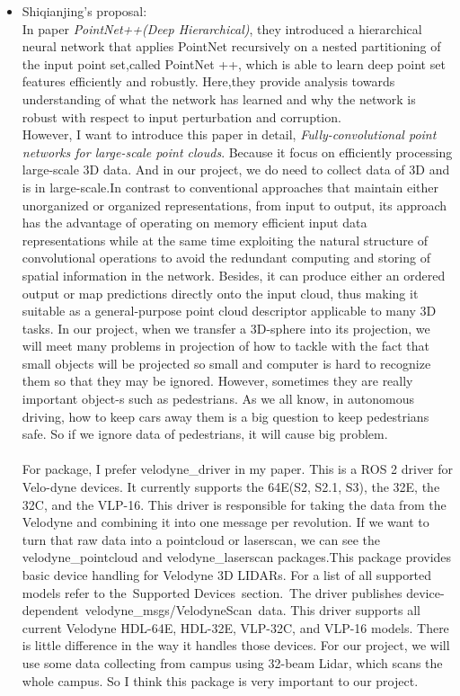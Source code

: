 \documentclass{article}
\begin{document}
\begin{normalsize}
\begin{itemize}
\item Shiqianjing's proposal:\\
In paper \emph{PointNet++(Deep Hierarchical)}\cite{qi2017pointnet++}, they introduced a hierarchical neural network that applies PointNet recursively on a nested partitioning of the input point set,called PointNet ++, which is able to learn deep point set features efficiently and robustly. Here\cite{qi2017pointnet},they provide analysis towards understanding of what the network has learned and why the network is robust with respect to input perturbation and corruption.\\

However, I want to introduce this paper in detail, \emph{Fully-convolutional point networks for large-scale point clouds}\cite{rethage2018fully}. Because it focus on efficiently processing large-scale 3D data. And in our project, we do need to collect data of 3D and is in large-scale.In contrast to conventional approaches that maintain either unorganized or  organized representations, from input to output, its approach has the advantage of operating on memory efficient input data representations while at the same time exploiting the natural structure of convolutional operations to avoid the redundant computing and storing of spatial information in the network. Besides, it can produce either an ordered output or map predictions directly onto the input cloud, thus making it suitable as a general-purpose point cloud descriptor applicable to many 3D tasks. In our project, when we transfer a 3D-sphere into its projection, we will meet many problems in projection of how to tackle with the fact that small objects will be projected so small and computer is hard to recognize them so that they may be ignored. However, sometimes they are really important object-s such as pedestrians. As we all know, in autonomous driving, how to keep cars away them is a big question to keep pedestrians safe. So if we ignore data of pedestrians, it will cause big problem.
\\\\
For package, I prefer velodyne\_driver in my paper. This is a ROS 2 driver for Velo-dyne devices. It currently supports the 64E(S2, S2.1, S3), the 32E, the 32C, and the VLP-16. This driver is responsible for taking the data from the Velodyne and  combining it into one message per revolution. If we want to turn that raw data into a pointcloud or laserscan, we can see the velodyne\_pointcloud and velodyne\_laserscan packages.This package provides basic device handling for Velodyne 3D LIDARs. For a list of all supported models refer to the Supported Devices section. The driver publishes device-dependent velodyne\_msgs/VelodyneScan data. This driver supports all current Velodyne HDL-64E, HDL-32E, VLP-32C, and VLP-16 models. There is little difference in the way it handles those devices. For our project, we will use some data collecting from campus using 32-beam Lidar, which scans the whole campus. So I think this package is very important to our project.\\
      ~\\


\end{itemize}
\end{normalsize}
\end{document}
